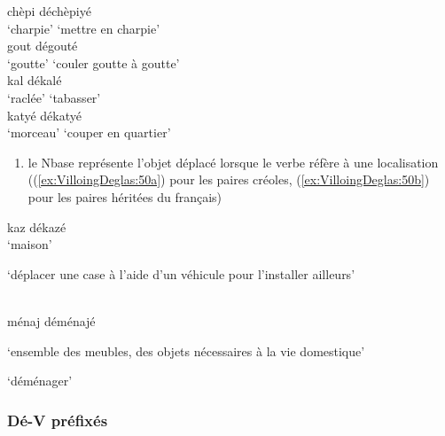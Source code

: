 \documentclass[output=paper]{langsci/langscibook}
\begin{document}
\ea \label{ex:VilloingDeglas:49}
      \ea \gll chèpi \textrightarrow{~} déchèpiyé\\
        {`charpie'} {} {`mettre en charpie'}\\
      \ex \gll  gout \textrightarrow{~} dégouté\\
        {`goutte'} {} {`couler goutte à goutte'}\\
      \ex \gll  kal \textrightarrow{~} dékalé\\
        {`raclée'} {} {`tabasser'}\\
      \ex \gll  katyé \textrightarrow{~} dékatyé\\
        {`morceau'} {} {`couper en quartier'}\\
\z\z


\begin{enumerate}[resume]\def\labelenumi{(\roman{enumi})}

\item
  le Nbase représente l'objet déplacé lorsque le verbe réfère à une
  localisation ((\ref{ex:VilloingDeglas:50a}) pour les paires créoles, (\ref{ex:VilloingDeglas:50b}) pour les paires
  héritées du français)
\end{enumerate}

\ea \label{ex:VilloingDeglas:50}
      \ea\label{ex:VilloingDeglas:50a} 
      \gll kaz \textrightarrow{~} dékazé\\
      `maison' {} {\begin{minipage}[t]{.5\textwidth}\raggedright `déplacer une case à l'aide d'un véhicule
        pour l'installer ailleurs'\end{minipage}}\\
      \ex\label{ex:VilloingDeglas:50b} \gll  ménaj  \textrightarrow{~} déménajé\\
      {\begin{minipage}[t]{.4\textwidth}\raggedright `ensemble des meubles, des objets nécessaires à la vie
        domestique'\end{minipage}} {} `déménager'\\
\z\z

\subsubsection{Dé-V préfixés}\label{subsubsection:VilloingDeglas:dé-v-préfixés}
\end{document}
